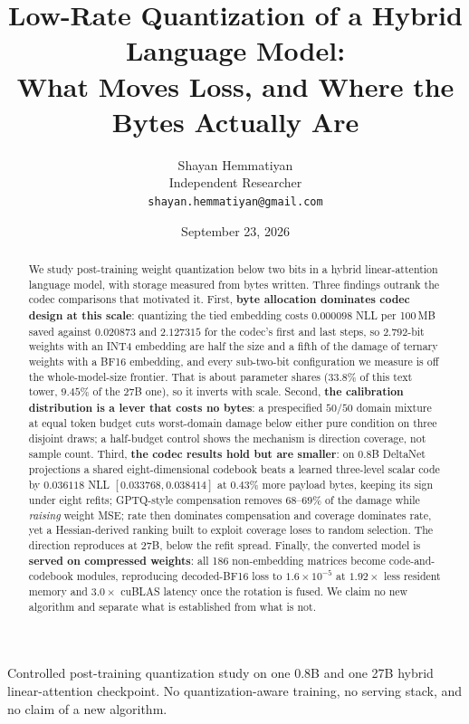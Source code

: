\documentclass[11pt]{article}
\title{Low-Rate Quantization of a Hybrid Language Model:\\
What Moves Loss, and Where the Bytes Actually Are}
\author{Shayan Hemmatiyan\\
\small Independent Researcher\\
\small \texttt{shayan.hemmatiyan@gmail.com}}
\date{September 23, 2026}
\begin{document}
\maketitle
\begin{center}\small
Controlled post-training quantization study on one 0.8B and one 27B hybrid
linear-attention checkpoint. No quantization-aware training, no serving stack,
and no claim of a new algorithm.
\end{center}

\begin{abstract}
We study post-training weight quantization below two bits in a hybrid
linear-attention language model, with storage measured from bytes written.
Three findings outrank the codec comparisons that motivated it. First,
\textbf{byte allocation dominates codec design at this scale}: quantizing the
tied embedding costs $0.000098$ NLL per 100\,MB saved against $0.020873$ and
$2.127315$ for the codec's first and last steps, so 2.792-bit weights with an
INT4 embedding are half the size and a fifth of the damage of ternary weights
with a BF16 embedding, and every sub-two-bit configuration we measure is off the
whole-model-size frontier. That is about parameter
shares ($33.8\%$ of this text tower, $9.45\%$ of the 27B one), so it inverts
with scale. Second, \textbf{the calibration distribution is a lever that
costs no bytes}: a prespecified $50/50$ domain mixture at equal token budget cuts
worst-domain damage below either pure condition on three disjoint draws; a
half-budget control shows the mechanism is direction coverage, not sample count.
Third, \textbf{the codec results hold but are smaller}: on 0.8B DeltaNet
projections a shared eight-dimensional codebook beats a learned three-level
scalar code by $0.036118$ NLL $[0.033768, 0.038414]$ at $0.43\%$ more payload
bytes, keeping its sign under eight refits; GPTQ-style compensation removes
$68$--$69\%$ of the damage while \emph{raising} weight MSE; rate then dominates
compensation and coverage dominates rate, yet a Hessian-derived ranking built to
exploit coverage loses to random selection. The direction reproduces at 27B,
below the refit spread. Finally, the converted model is \textbf{served on compressed
weights}: all 186 non-embedding matrices become code-and-codebook modules,
reproducing decoded-BF16 loss to $1.6\times10^{-5}$ at $1.92\times$ less
resident memory and $3.0\times$ cuBLAS latency once the rotation is fused. We
claim no new algorithm and separate what is established from what is not.
\end{abstract}
\end{document}
